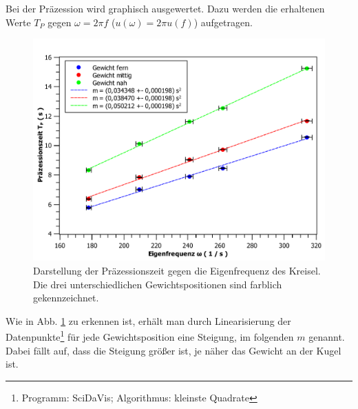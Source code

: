 	Bei der Präzession wird graphisch ausgewertet.
	Dazu werden die erhaltenen Werte $T_P$ gegen $\omega = 2\pi f$ ($u(\omega) = 2\pi u(f)$) aufgetragen.
	\begin{figure}[ht]
		\centering
		\includegraphics[width=\textwidth]{kreisel_wT_multi.pdf}
		\caption{Darstellung der Präzessionszeit gegen die Eigenfrequenz des Kreisel. Die drei unterschiedlichen Gewichtspositionen sind farblich gekennzeichnet.}
		\label{abb:Tw-multi}	
	\end{figure}
	Wie in Abb. \ref{abb:Tw-multi} zu erkennen ist, erhält man durch Linearisierung der Datenpunkte\footnote{Programm: SciDaVis; Algorithmus: kleinste Quadrate} für jede Gewichtsposition eine Steigung, im folgenden $m$ genannt.
	Dabei fällt auf, dass die Steigung größer ist, je näher das Gewicht an der Kugel ist.
	
